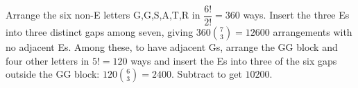 Arrange the six non-E letters G,G,S,A,T,R in $\dfrac{6!}{2!}=360$ ways. Insert the three Es into three distinct gaps among seven, giving $360\binom73=12600$ arrangements with no adjacent Es. Among these, to have adjacent Gs, arrange the GG block and four other letters in $5!=120$ ways and insert the Es into three of the six gaps outside the GG block: $120\binom63=2400$. Subtract to get $\boxed{10200}$.

